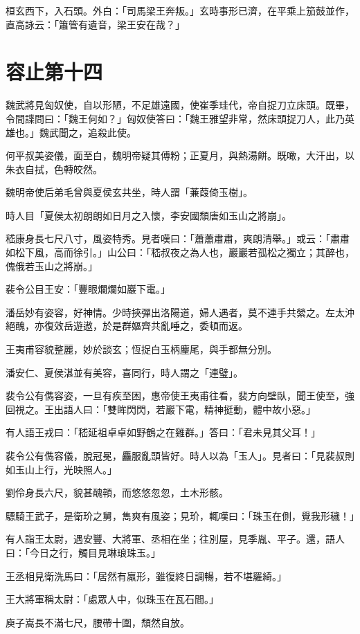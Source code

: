 桓玄西下，入石頭。外白：「司馬梁王奔叛。」玄時事形已濟，在平乘上笳鼓並作，直高詠云：「簫管有遺音，梁王安在哉？」



\chapter{容止第十四}

魏武將見匈奴使，自以形陋，不足雄遠國，使崔季珪代，帝自捉刀立床頭。既畢，令間諜問曰：「魏王何如？」匈奴使答曰：「魏王雅望非常，然床頭捉刀人，此乃英雄也。」魏武聞之，追殺此使。

何平叔美姿儀，面至白，魏明帝疑其傅粉；正夏月，與熱湯餅。既噉，大汗出，以朱衣自拭，色轉皎然。

魏明帝使后弟毛曾與夏侯玄共坐，時人謂「蒹葭倚玉樹」。

時人目「夏侯太初朗朗如日月之入懷，李安國頹唐如玉山之將崩」。

嵇康身長七尺八寸，風姿特秀。見者嘆曰：「蕭蕭肅肅，爽朗清舉。」或云：「肅肅如松下風，高而徐引。」山公曰：「嵇叔夜之為人也，巖巖若孤松之獨立；其醉也，傀俄若玉山之將崩。」

裴令公目王安：「豐眼爛爛如巖下電。」

潘岳妙有姿容，好神情。少時挾彈出洛陽道，婦人遇者，莫不連手共縈之。左太沖絕醜，亦復效岳遊遨，於是群嫗齊共亂唾之，委頓而返。

王夷甫容貌整麗，妙於談玄；恆捉白玉柄麈尾，與手都無分別。

潘安仁、夏侯湛並有美容，喜同行，時人謂之「連璧」。

裴令公有儁容姿，一旦有疾至困，惠帝使王夷甫往看，裴方向壁臥，聞王使至，強回視之。王出語人曰：「雙眸閃閃，若巖下電，精神挺動，體中故小惡。」

有人語王戎曰：「嵇延祖卓卓如野鶴之在雞群。」答曰：「君未見其父耳！」

裴令公有儁容儀，脫冠冕，麤服亂頭皆好。時人以為「玉人」。見者曰：「見裴叔則如玉山上行，光映照人。」

劉伶身長六尺，貌甚醜顇，而悠悠忽忽，土木形骸。

驃騎王武子，是衛玠之舅，雋爽有風姿；見玠，輒嘆曰：「珠玉在側，覺我形穢！」

有人詣王太尉，遇安豐、大將軍、丞相在坐；往別屋，見季胤、平子。還，語人曰：「今日之行，觸目見琳琅珠玉。」

王丞相見衛洗馬曰：「居然有羸形，雖復終日調暢，若不堪羅綺。」

王大將軍稱太尉：「處眾人中，似珠玉在瓦石間。」

庾子嵩長不滿七尺，腰帶十圍，頹然自放。

